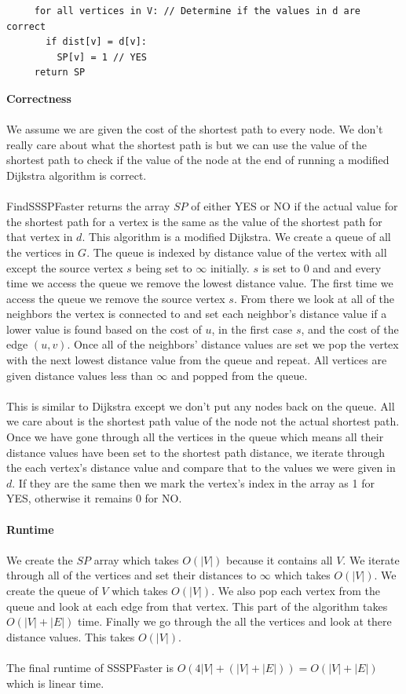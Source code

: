 \documentclass[12pt]{article}
\begin{document}
\begin{enumerate}
\begin{verbatim}
	 for all vertices in V: // Determine if the values in d are correct
	   if dist[v] = d[v]:
	     SP[v] = 1 // YES
	 return SP
	\end{verbatim}
	\textbf{Correctness}\\
	\\
	We assume we are given the cost of the shortest path to every node.  
	We don't really care about what the shortest path is but we can use the value of the shortest path to check if the value of the node
	at the end of running a modified Dijkstra algorithm is correct.\\
	\\
	FindSSSPFaster returns the array $SP$ of either YES or NO if the actual value for the shortest path for a vertex is the same as the value of the shortest path for that vertex in $d$.  
	This algorithm is a modified Dijkstra.  We create a queue of all the vertices in $G$.  The queue is indexed by distance value of the vertex with all except the source vertex $s$ being set to $\infty$ initially.   
	$s$ is set to $0$ and and every time we access the queue we remove the lowest distance value.   The first time we access the queue we remove the source vertex $s$.  
	From there we look at all of the neighbors the vertex is connected to and set each neighbor's distance value if a
	lower value is found based on the cost of $u$, in the first case $s$, and the cost of the edge $(u,v)$.  
	Once all of the neighbors' distance values are set we pop the vertex with the next lowest distance value from the queue and repeat.  
	All vertices are given distance values less than $\infty$ and popped from the queue.\\
	\\
	This is similar to Dijkstra except we don't put any nodes back on the queue.  All we care about is the shortest path value of the node not the actual shortest path.   
	Once we have gone through all the vertices in the queue which means all their distance values have been set to the shortest path distance, 
	we iterate through the each vertex's distance value and compare that to the values we were given in $d$.  
	If they are the same then we mark the vertex's index in the array as 1 for YES, otherwise it remains 0 for NO.\\
	\\
	\textbf{Runtime}\\
	\\
	We create the $SP$ array which takes $O(|V|)$ because it contains all $V$.  We iterate through all of the vertices and set their distances to $\infty$ which takes $O(|V|)$.
	We create the queue of $V$ which takes $O(|V|)$.  We also pop each vertex from the queue and look at each edge from that vertex.  
	This part of the algorithm takes $O(|V|+|E|)$ time.  Finally we go through the all the vertices and look at there distance values.  This takes $O(|V|)$.\\
	\\
	The final runtime of SSSPFaster is $O(4|V| + (|V|+|E|)) = O(|V|+|E|)$ which is linear time.
	\\
	
\end{enumerate}
\end{document}
